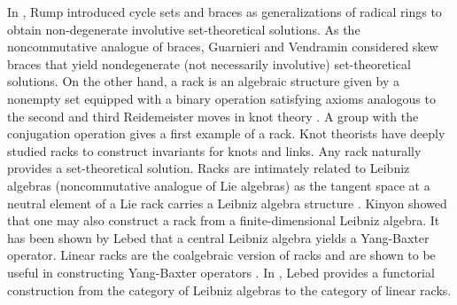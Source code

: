\documentclass[a4paper,reqno,10pt]{amsart}
\theoremstyle{plain}
\theoremstyle{definition}
\theoremstyle{remark}
\begin{document}
In \cite{rump0, rump}, Rump introduced cycle sets and braces as generalizations of radical rings to obtain non-degenerate involutive set-theoretical solutions. As the noncommutative analogue of braces, Guarnieri and Vendramin \cite{guar} considered skew braces that yield nondegenerate (not necessarily involutive) set-theoretical solutions. On the other hand, a rack is an algebraic structure given by a nonempty set equipped with a binary operation satisfying axioms analogous to the second and third Reidemeister moves in knot theory \cite{etingof, jack}. A group with the conjugation operation gives a first example of a rack. Knot theorists have deeply studied racks to construct invariants for knots and links. Any rack naturally provides a set-theoretical solution. Racks are intimately related to Leibniz algebras \cite{bloh,loday} (noncommutative analogue of Lie algebras) as the tangent space at a neutral element of a Lie rack carries a Leibniz algebra structure \cite{kinyon}. Kinyon \cite{kinyon} showed that one may also construct a rack from a finite-dimensional Leibniz algebra. It has been shown by Lebed \cite{lebed2} that a central Leibniz algebra yields a Yang-Baxter operator. Linear racks are the coalgebraic version of racks and are shown to be useful in constructing Yang-Baxter operators \cite{kram,carter,lebed,lebed2}. In \cite{lebed}, Lebed provides a functorial construction from the category of Leibniz algebras to the category of linear racks.


\end{document}
